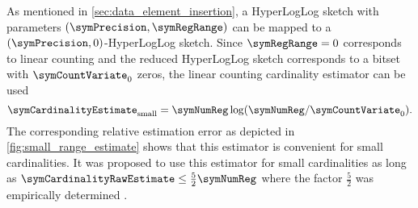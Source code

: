 \documentclass[a4paper]{scrartcl}
\begin{document}
As mentioned in \cref{sec:data_element_insertion}, a HyperLogLog sketch with parameters $(\symPrecision, \symRegRange)$ can be mapped to a $(\symPrecision, 0)$-HyperLogLog sketch. Since $\symRegRange=0$ corresponds to linear counting and the reduced HyperLogLog sketch corresponds to a bitset with $\symCountVariate_0$ zeros, the linear counting cardinality estimator \cite{Whang1990} can be used
\begin{equation}
\label{equ:linear_counting_estimator}
\symCardinalityEstimate_\text{small} = \symNumReg \log(\symNumReg/\symCountVariate_0).
\end{equation}
The corresponding relative estimation error as depicted in \cref{fig:small_range_estimate} shows that this estimator is convenient for small cardinalities. It was proposed to use this estimator for small cardinalities as long as $\symCardinalityRawEstimate \leq \frac{5}{2}\symNumReg$ where the factor $\frac{5}{2}$ was empirically determined \cite{Flajolet2007}. 
\end{document}
